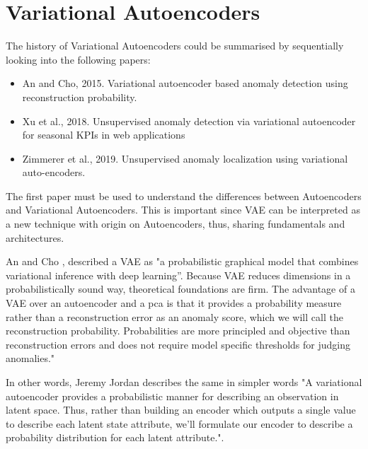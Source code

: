 \section*{Variational Autoencoders}

The history of Variational Autoencoders could be summarised by sequentially looking into the following papers:

\begin{itemize}
    \item An and Cho, 2015. Variational autoencoder based anomaly detection using reconstruction probability. \cite{ancho}
    \item Xu et al., 2018. Unsupervised anomaly detection via variational autoencoder for seasonal KPIs in web applications \cite{xuetal}
    \item Zimmerer et al., 2019. Unsupervised anomaly localization using variational auto-encoders. \cite{zimmereretal}
\end{itemize}

The first paper must be used to understand the differences between Autoencoders and Variational Autoencoders. This is important since VAE can be interpreted as a new technique with origin on Autoencoders, thus, sharing fundamentals and architectures.

An and Cho \cite{ancho}, described a VAE as "a probabilistic graphical model that combines variational inference with deep learning”. Because VAE reduces dimensions in a probabilistically sound way, theoretical foundations are firm. The advantage of a VAE over an autoencoder and a \acrshort{pca} is that it provides a probability measure rather than a reconstruction error as an anomaly score, which we will call the reconstruction probability. Probabilities are more principled and objective than reconstruction errors and does not require model specific thresholds for judging anomalies."

In other words, Jeremy Jordan \cite{jjordan} describes the same in simpler words "A variational autoencoder provides a probabilistic manner for describing an observation in latent space. Thus, rather than building an encoder which outputs a single value to describe each latent state attribute, we'll formulate our encoder to describe a probability distribution for each latent attribute.".

